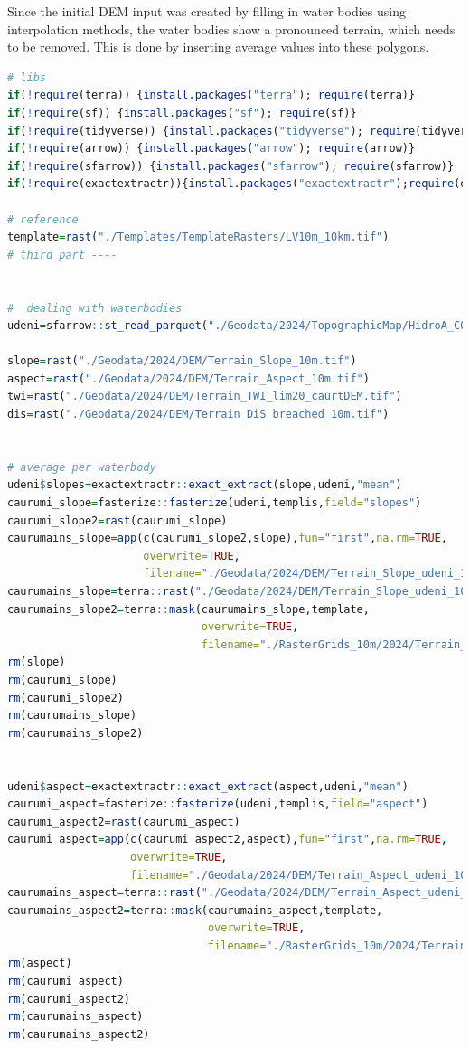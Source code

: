 \documentclass[
]{book}
\begin{document}
Since the initial DEM input was created by filling in water bodies using
interpolation methods, the water bodies show a pronounced terrain, which needs
to be removed. This is done by inserting average values into these polygons.

\begin{lstlisting}[language=R]
# libs
if(!require(terra)) {install.packages("terra"); require(terra)}
if(!require(sf)) {install.packages("sf"); require(sf)}
if(!require(tidyverse)) {install.packages("tidyverse"); require(tidyverse)}
if(!require(arrow)) {install.packages("arrow"); require(arrow)}
if(!require(sfarrow)) {install.packages("sfarrow"); require(sfarrow)}
if(!require(exactextractr)){install.packages("exactextractr");require(exactextractr)}

# reference
template=rast("./Templates/TemplateRasters/LV10m_10km.tif")
# third part ----


#  dealing with waterbodies 
udeni=sfarrow::st_read_parquet("./Geodata/2024/TopographicMap/HidroA_COMB.parquet")

slope=rast("./Geodata/2024/DEM/Terrain_Slope_10m.tif")
aspect=rast("./Geodata/2024/DEM/Terrain_Aspect_10m.tif")
twi=rast("./Geodata/2024/DEM/Terrain_TWI_lim20_caurtDEM.tif")
dis=rast("./Geodata/2024/DEM/Terrain_DiS_breached_10m.tif")


# average per waterbody
udeni$slopes=exactextractr::exact_extract(slope,udeni,"mean")
caurumi_slope=fasterize::fasterize(udeni,templis,field="slopes")
caurumi_slope2=rast(caurumi_slope)
caurumains_slope=app(c(caurumi_slope2,slope),fun="first",na.rm=TRUE,
                     overwrite=TRUE,
                     filename="./Geodata/2024/DEM/Terrain_Slope_udeni_10m.tif")
caurumains_slope=terra::rast("./Geodata/2024/DEM/Terrain_Slope_udeni_10m.tif")
caurumains_slope2=terra::mask(caurumains_slope,template,
                              overwrite=TRUE,
                              filename="./RasterGrids_10m/2024/Terrain_Slope_udeni2_10m.tif")
rm(slope)
rm(caurumi_slope)
rm(caurumi_slope2)
rm(caurumains_slope)
rm(caurumains_slope2)


udeni$aspect=exactextractr::exact_extract(aspect,udeni,"mean")
caurumi_aspect=fasterize::fasterize(udeni,templis,field="aspect")
caurumi_aspect2=rast(caurumi_aspect)
caurumi_aspect=app(c(caurumi_aspect2,aspect),fun="first",na.rm=TRUE,
                   overwrite=TRUE,
                   filename="./Geodata/2024/DEM/Terrain_Aspect_udeni_10m.tif")
caurumains_aspect=terra::rast("./Geodata/2024/DEM/Terrain_Aspect_udeni_10m.tif")
caurumains_aspect2=terra::mask(caurumains_aspect,template,
                               overwrite=TRUE,
                               filename="./RasterGrids_10m/2024/Terrain_Aspect_udeni2_10m.tif")
rm(aspect)
rm(caurumi_aspect)
rm(caurumi_aspect2)
rm(caurumains_aspect)
rm(caurumains_aspect2)




\end{lstlisting}
\end{document}
